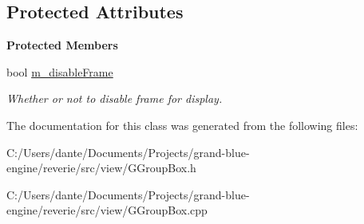 \subsection*{Protected Attributes}
\begin{Indent}\textbf{ Protected Members}\par
\begin{DoxyCompactItemize}
\item 
\mbox{\label{classrev_1_1_view_1_1_group_box_a52ea7a5f8c47e468335a29cdd6d17430}} 
bool \mbox{\hyperlink{classrev_1_1_view_1_1_group_box_a52ea7a5f8c47e468335a29cdd6d17430}{m\+\_\+disable\+Frame}}
\begin{DoxyCompactList}\small\item\em Whether or not to disable frame for display. \end{DoxyCompactList}\end{DoxyCompactItemize}
\end{Indent}


The documentation for this class was generated from the following files\+:\begin{DoxyCompactItemize}
\item 
C\+:/\+Users/dante/\+Documents/\+Projects/grand-\/blue-\/engine/reverie/src/view/G\+Group\+Box.\+h\item 
C\+:/\+Users/dante/\+Documents/\+Projects/grand-\/blue-\/engine/reverie/src/view/G\+Group\+Box.\+cpp\end{DoxyCompactItemize}
